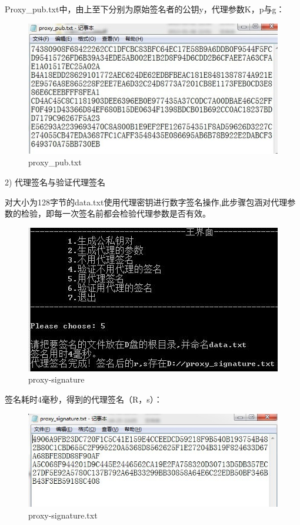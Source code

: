 Proxy\_pub.txt中，由上至下分别为原始签名者的公钥y，代理参数K，p与g：

\begin{figure}[H]
\centering
\includegraphics{img/23.jpg}
\caption{proxy\_pub.txt}
\end{figure}

2)  代理签名与验证代理签名

对大小为128字节的data.txt使用代理密钥进行数字签名操作,此步骤包涵对代理参数的检验，即每一次签名前都会检验代理参数是否有效。

\begin{figure}[H]
\centering
\includegraphics{img/24.jpg}
\caption{proxy-signature}
\end{figure}

签名耗时4毫秒，得到的代理签名（R，s）：

\begin{figure}[H]
\centering
\includegraphics{img/25.jpg}
\caption{proxy-signature.txt}
\end{figure}

